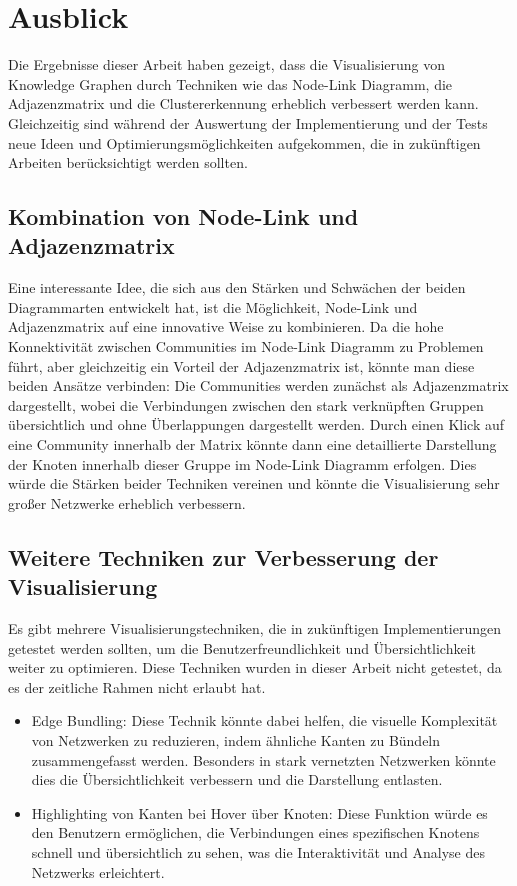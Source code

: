\section{Ausblick}

Die Ergebnisse dieser Arbeit haben gezeigt, dass die Visualisierung von Knowledge Graphen durch Techniken wie das Node-Link Diagramm, die Adjazenzmatrix und die Clustererkennung erheblich verbessert werden kann. Gleichzeitig sind während der Auswertung der Implementierung und der Tests neue Ideen und Optimierungsmöglichkeiten aufgekommen, die in zukünftigen Arbeiten berücksichtigt werden sollten.

\subsection{Kombination von Node-Link und Adjazenzmatrix}

Eine interessante Idee, die sich aus den Stärken und Schwächen der beiden Diagrammarten entwickelt hat, ist die Möglichkeit, Node-Link und Adjazenzmatrix auf eine innovative Weise zu kombinieren. Da die hohe Konnektivität zwischen Communities im Node-Link Diagramm zu Problemen führt, aber gleichzeitig ein Vorteil der Adjazenzmatrix ist, könnte man diese beiden Ansätze verbinden: Die Communities werden zunächst als Adjazenzmatrix dargestellt, wobei die Verbindungen zwischen den stark verknüpften Gruppen übersichtlich und ohne Überlappungen dargestellt werden. Durch einen Klick auf eine Community innerhalb der Matrix könnte dann eine detaillierte Darstellung der Knoten innerhalb dieser Gruppe im Node-Link Diagramm erfolgen. Dies würde die Stärken beider Techniken vereinen und könnte die Visualisierung sehr großer Netzwerke erheblich verbessern.

\subsection{Weitere Techniken zur Verbesserung der Visualisierung}

Es gibt mehrere Visualisierungstechniken, die in zukünftigen Implementierungen getestet werden sollten, um die Benutzerfreundlichkeit und Übersichtlichkeit weiter zu optimieren. Diese Techniken wurden in dieser Arbeit nicht getestet, da es der zeitliche Rahmen nicht erlaubt hat.

\begin{itemize}
    \item Edge Bundling: Diese Technik könnte dabei helfen, die visuelle Komplexität von Netzwerken zu reduzieren, indem ähnliche Kanten zu Bündeln zusammengefasst werden. Besonders in stark vernetzten Netzwerken könnte dies die Übersichtlichkeit verbessern und die Darstellung entlasten.
    \item Highlighting von Kanten bei Hover über Knoten: Diese Funktion würde es den Benutzern ermöglichen, die Verbindungen eines spezifischen Knotens schnell und übersichtlich zu sehen, was die Interaktivität und Analyse des Netzwerks erleichtert.
\end{itemize}

